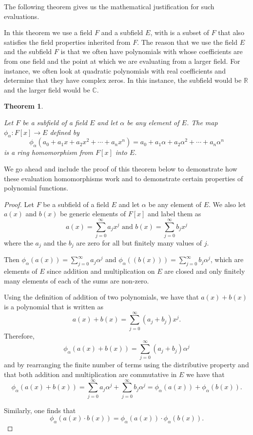 \documentclass[
]{book}
\newtheorem{theorem}{Theorem}[chapter]
\theoremstyle{definition}
\theoremstyle{definition}
\theoremstyle{definition}
\theoremstyle{definition}
\theoremstyle{remark}
\begin{document}
The following theorem gives us the mathematical justification for such evaluations.

In this theorem we use a field \(F\) and a subfield \(E\), with is a subset of \(F\) that also satisfies the field properties inherited from \(F\). The reason that we use the field \(E\) and the subfield \(F\) is that we often have polynomials with whose coefficients are from one field and the point at which we are evaluating from a larger field. For instance, we often look at quadratic polynomials with real coefficients and determine that they have complex zeros. In this instance, the subfield would be \(\mathbb{R}\) and the larger field would be \(\mathbb{C}\).

\begin{theorem}
\protect\hypertarget{thm:unlabeled-div-114}{}\label{thm:unlabeled-div-114}

Let \(F\) be a subfield of a field \(E\) and let \(\alpha\) be any element of \(E\). The map \(\phi_\alpha: F[x] \rightarrow E\) defined by \[\phi_\alpha(a_0 + a_1 x + a_2 x^2 + \cdots + a_n x^n) = a_0 + a_1 \alpha + a_2 \alpha^2 + \cdots + a_n \alpha^n\] is a ring homomorphism from \(F[x]\) into \(E\).

\end{theorem}

We go ahead and include the proof of this theorem below to demonstrate how these evaluation homomorphisms work and to demonstrate certain properties of polynomial functions.

\begin{proof}

Let \(F\) be a subfield of a field \(E\) and let \(\alpha\) be any element of \(E\). We also let \(a(x)\) and \(b(x)\) be generic elements of \(F[x]\) and label them as
\[a(x) = \sum_{j=0}^\infty a_j x^j \mbox{ and } b(x)=\sum_{j=0}^\infty b_j x^j\] where the \(a_j\) and the \(b_j\) are zero for all but finitely many values of \(j\).

Then \(\phi_\alpha \left(a(x)\right) = \sum_{j=0}^\infty a_j \alpha^j\) and \(\phi_\alpha\left(\left(b(x)\right)\right) = \sum_{j=0}^\infty b_j \alpha^j\), which are elements of \(E\) since addition and multiplication on \(E\) are closed and only finitely many elements of each of the sums are non-zero.

Using the definition of addition of two polynomials, we have that \(a(x)+b(x)\) is a polynomial that is written as \[a(x)+b(x) = \sum_{j=0}^\infty (a_j+b_j) x^j.\]
Therefore,
\[\phi_\alpha \left(a(x)+b(x)\right) = \sum_{j=0}^\infty (a_j+b_j) \alpha^j\] and by rearranging the finite number of terms using the distributive property and that both addition and multiplication are commutative in \(E\) we have that
\[\phi_\alpha \left(a(x)+b(x)\right) = \sum_{j=0}^\infty a_j \alpha^j + \sum_{j=0}^\infty b_j \alpha^j = \phi_\alpha \left(a(x)\right) + \phi_\alpha \left(b(x)\right). \]

Similarly, one finds that
\[\phi_\alpha \left(a(x) \cdot b(x)\right) = \phi_\alpha (a(x)) \cdot \phi_\alpha(b(x)).\]

\end{proof}
\end{document}
